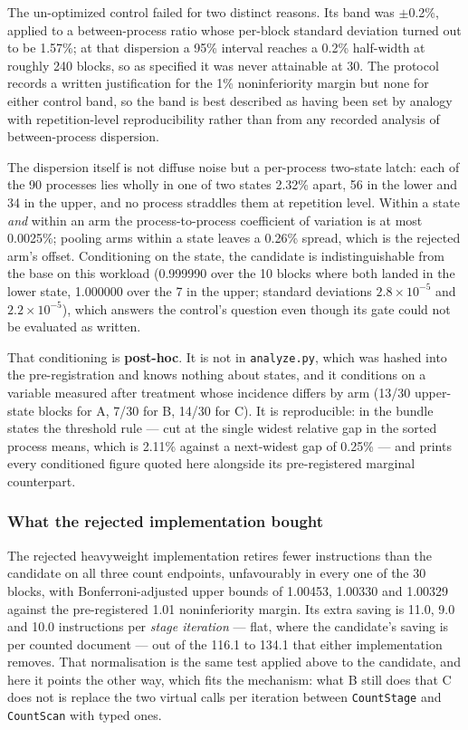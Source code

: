\documentclass[10pt]{article}
\newcommand{\code}[1]{\texttt{#1}}
\begin{document}
The un-optimized control failed for two distinct reasons. Its band was
$\pm$0.2\%, applied to a between-process ratio whose per-block standard
deviation turned out to be 1.57\%; at that dispersion a 95\% interval reaches a
0.2\% half-width at roughly 240 blocks, so as specified it was never attainable
at 30. The protocol records a written justification for the 1\% noninferiority
margin but none for either control band, so the band is best described as
having been set by analogy with repetition-level reproducibility rather than
from any recorded analysis of between-process dispersion.

The dispersion itself is not diffuse noise but a per-process two-state latch:
each of the 90 processes lies wholly in one of two states 2.32\% apart, 56 in
the lower and 34 in the upper, and no process straddles them at repetition
level. Within a state \emph{and} within an arm the process-to-process
coefficient of variation is at most 0.0025\%; pooling arms within a state leaves a 0.26\%
spread, which is the rejected arm's offset. Conditioning on the state, the
candidate is indistinguishable from the base on this workload (0.999990 over the
10 blocks where both landed in the lower state, 1.000000 over the 7 in the
upper; standard deviations $2.8\times10^{-5}$ and $2.2\times10^{-5}$), which
answers the control's question even though its gate could not be evaluated as
written.

That conditioning is \textbf{post-hoc}. It is not in \code{analyze.py}, which
was hashed into the pre-registration and knows nothing about states, and it
conditions on a variable measured after treatment whose incidence differs by arm
(13/30 upper-state blocks for A, 7/30 for B, 14/30 for C). It is reproducible:
 in the bundle states the threshold rule --- cut
at the single widest relative gap in the sorted process means, which is 2.11\%
against a next-widest gap of 0.25\% --- and prints every conditioned figure
quoted here alongside its pre-registered marginal counterpart.

\subsubsection{What the rejected implementation bought}

The rejected heavyweight implementation retires fewer instructions than the
candidate on all three count endpoints, unfavourably in every one of the 30
blocks, with Bonferroni-adjusted upper bounds of 1.00453, 1.00330 and 1.00329
against the pre-registered 1.01 noninferiority margin. Its extra saving is 11.0,
9.0 and 10.0 instructions per \emph{stage iteration} --- flat, where the
candidate's saving is per counted document --- out of the 116.1 to 134.1 that
either implementation removes. That normalisation is the same test applied above
to the candidate, and here it points the other way, which fits the mechanism:
what B still does that C does not is replace the two virtual calls per iteration
between \code{CountStage} and \code{CountScan} with typed ones.
\end{document}
